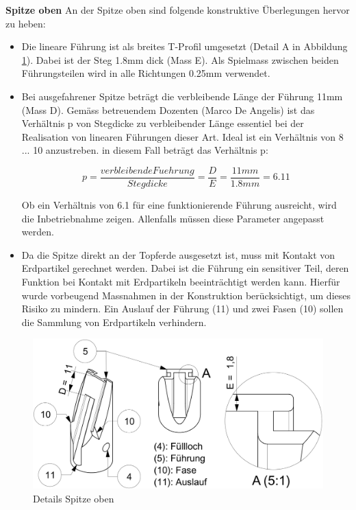 \textbf{Spitze oben}
\newline
An der Spitze oben sind folgende konstruktive Überlegungen hervor zu heben:
\begin{itemize}
	\item Die lineare Führung ist als breites T-Profil umgesetzt (Detail A in Abbildung \ref{fig:details_spitze_oben}). Dabei ist der Steg 1.8mm dick (Mass E). Als Spielmass zwischen beiden Führungsteilen wird in alle Richtungen 0.25mm verwendet.
	
	\item Bei ausgefahrener Spitze beträgt die verbleibende Länge der Führung 11mm (Mass D). Gemäss betreuendem Dozenten (Marco De Angelis) ist das Verhältnis p von Stegdicke zu verbleibender Länge essentiel bei der Realisation von linearen Führungen dieser Art. Ideal ist ein Verhältnis von 8 ... 10 anzustreben. in diesem Fall beträgt das Verhältnis p:
	
	\begin{equation}
	p=\frac{verbleibende Fuehrung}{Stegdicke}=\frac{D}{E}=\frac{11mm}{1.8mm}=6.11
	\end{equation}
		
	Ob ein Verhältnis von 6.1 für eine funktionierende Führung ausreicht, wird die Inbetriebnahme zeigen. Allenfalls müssen diese Parameter angepasst werden.
	
	\item Da die Spitze direkt an der Topferde ausgesetzt ist, muss mit Kontakt von Erdpartikel gerechnet werden. Dabei ist die Führung ein sensitiver Teil, deren Funktion bei Kontakt mit Erdpartikeln beeinträchtigt werden kann. Hierfür wurde vorbeugend Massnahmen in der Konstruktion berücksichtigt, um dieses Risiko zu mindern. Ein Auslauf der Führung (11) und zwei Fasen (10) sollen die Sammlung von Erdpartikeln verhindern.
	\end{itemize}
	\begin{figure}[H]
	\includegraphics[scale=1.0]{Illustrationen/6-Umsetzung/details_spitze_oben.jpg}
	\caption{Details Spitze oben}
	\label{fig:details_spitze_oben}
	\end{figure}

